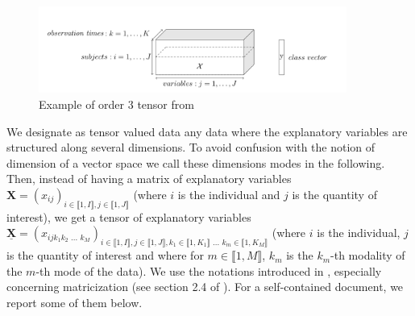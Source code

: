 \documentclass[preprint,12pt]{elsarticle}
\begin{document}
\begin{figure}[tbp]
    \includegraphics[width=0.9\textwidth]{images/tensor.png}
    \caption{Example of order 3 tensor from \cite{multi_rank_r}}
    \label{fig:tensor}
\end{figure}
\noindent We designate as tensor valued data any data where the explanatory variables are structured along several dimensions. To avoid confusion with the notion of dimension of a vector space we call these dimensions modes in the following. Then, instead of having a matrix of explanatory variables $\mathbf{X} = (x_{ij})_{i \in \llbracket 1, I \rrbracket, j \in \llbracket 1, J \rrbracket}$ (where $i$ is the individual and $j$ is the quantity of interest), we get a tensor of explanatory variables $\underline{\mathbf{X}} = (x_{ijk_1k_2\text{ ... }k_M})_{i \in \llbracket 1, I \rrbracket, j \in \llbracket 1, J \rrbracket, k_1 \in \llbracket 1, K_1 \rrbracket \text{ ... } k_m \in\llbracket 1, K_M \rrbracket } $  (where $i$ is the individual, $j$ is the quantity of interest and where for $m \in \llbracket 1, M \rrbracket$, $k_m$ is the $k_m$-th modality of the $m$-th mode of the data). We use the notations introduced in \cite{conventions}, especially concerning matricization (see section 2.4 of \cite{conventions}). For a self-contained document, we report some of them below.\\
\end{document}
